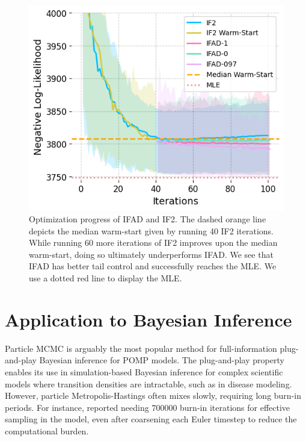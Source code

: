 \documentclass[9pt,twocolumn,pnasresearcharticle]{pnas-new}
\newcommand\arxiv[2]{#2} %
\begin{document}
\begin{figure}[ht]
    \centering
    \includegraphics[width=\arxiv{10cm}{\textwidth/3}]{imgs/095/optim.png}
    \arxiv{}{\vspace*{-1mm}}
    \caption{Optimization progress of IFAD and IF2. The dashed orange line depicts the median warm-start given by running 40 IF2 iterations. While running 60 more iterations of IF2 improves upon the median warm-start, doing so ultimately underperforms IFAD. We see that IFAD has better tail control and successfully reaches the MLE. 
    We use a dotted red line to display the MLE.}
    \label{fig:optim}
    \arxiv{}{\vspace*{-4mm}}
\end{figure}

\arxiv{}{\vspace*{-2mm}}
\section{Application to Bayesian Inference}
\label{sec:bayes}

Particle MCMC \cite{andrieu10} is arguably the most popular method for full-information plug-and-play Bayesian inference for POMP models.
The plug-and-play property enables its use in simulation-based Bayesian inference for complex scientific models where transition densities are intractable, such as in disease modeling.
However, particle Metropolis-Hastings often mixes slowly, requiring long burn-in periods.
For instance, \cite{fasiolo16} reported needing $700000$ burn-in iterations for effective sampling in the \cite{king08} model, even after coarsening each Euler timestep to reduce the computational burden. 
\end{document}

